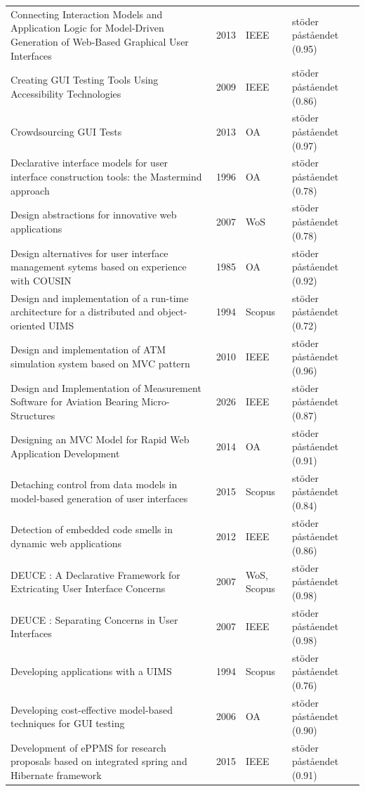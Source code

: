 \begin{longtable}{@{}%
  >{\raggedright\arraybackslash}p{}c%
  >{\raggedright\arraybackslash}p{}%
  >{\raggedright\arraybackslash}p{}@{}}
Connecting Interaction Models and Application Logic for Model-Driven Generation of Web-Based Graphical User Interfaces & 2013 & IEEE & stöder påståendet (0.95) \\
Creating GUI Testing Tools Using Accessibility Technologies & 2009 & IEEE & stöder påståendet (0.86) \\
Crowdsourcing GUI Tests & 2013 & OA & stöder påståendet (0.97) \\
Declarative interface models for user interface construction tools: the Mastermind approach & 1996 & OA & stöder påståendet (0.78) \\
Design abstractions for innovative web applications & 2007 & WoS & stöder påståendet (0.78) \\
Design alternatives for user interface management sytems based on experience with COUSIN & 1985 & OA & stöder påståendet (0.92) \\
Design and implementation of a run-time architecture for a distributed and object-oriented UIMS & 1994 & Scopus & stöder påståendet (0.72) \\
Design and implementation of ATM simulation system based on MVC pattern & 2010 & IEEE & stöder påståendet (0.96) \\
Design and Implementation of Measurement Software for Aviation Bearing Micro-Structures & 2026 & IEEE & stöder påståendet (0.87) \\
Designing an MVC Model for Rapid Web Application Development & 2014 & OA & stöder påståendet (0.91) \\
Detaching control from data models in model-based generation of user interfaces & 2015 & Scopus & stöder påståendet (0.84) \\
Detection of embedded code smells in dynamic web applications & 2012 & IEEE & stöder påståendet (0.86) \\
DEUCE : A Declarative Framework for Extricating User Interface Concerns & 2007 & WoS, Scopus & stöder påståendet (0.98) \\
DEUCE : Separating Concerns in User Interfaces & 2007 & IEEE & stöder påståendet (0.98) \\
Developing applications with a UIMS & 1994 & Scopus & stöder påståendet (0.76) \\
Developing cost-effective model-based techniques for GUI testing & 2006 & OA & stöder påståendet (0.90) \\
Development of ePPMS for research proposals based on integrated spring and Hibernate framework & 2015 & IEEE & stöder påståendet (0.91) \\

\end{longtable}

